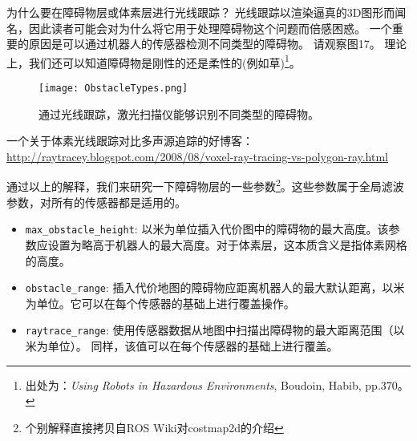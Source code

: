 为什么要在障碍物层或体素层进行光线跟踪？
光线跟踪以渲染逼真的3D图形而闻名，因此读者可能会对为什么将它用于处理障碍物这个问题而倍感困惑。
一个重要的原因是可以通过机器人的传感器检测不同类型的障碍物。
请观察图17。
理论上，我们还可以知道障碍物是刚性的还是柔性的(例如草)\footnote{出处为：\textit{Using Robots in Hazardous Environments}, Boudoin, Habib, pp.370。}。

\begin{figure}[!h]
	\begin{center}
		\texttt{[image: ObstacleTypes.png]}
		\caption{通过光线跟踪，激光扫描仪能够识别不同类型的障碍物。}
	\end{center}
\end{figure}

一个关于体素光线跟踪对比多声源追踪的好博客：
\url{http://raytracey.blogspot.com/2008/08/voxel-ray-tracing-vs-polygon-ray.html} 

通过以上的解释，我们来研究一下障碍物层的一些参数\footnote{个别解释直接拷贝自ROS Wiki对costmap2d的介绍}。这些参数属于全局滤波参数，对所有的传感器都是适用的。

\begin{itemize}
	\item \texttt{max_obstacle_height}: 
	以米为单位插入代价图中的障碍物的最大高度。该参数应设置为略高于机器人的最大高度。对于体素层，这本质含义是指体素网格的高度。
	
	\item \texttt{obstacle_range}: 
	插入代价地图的障碍物应距离机器人的最大默认距离，以米为单位。它可以在每个传感器的基础上进行覆盖操作。
	
	\item \texttt{raytrace_range}: 
	使用传感器数据从地图中扫描出障碍物的最大距离范围（以米为单位）。 同样，该值可以在每个传感器的基础上进行覆盖。
	
\end{itemize}

